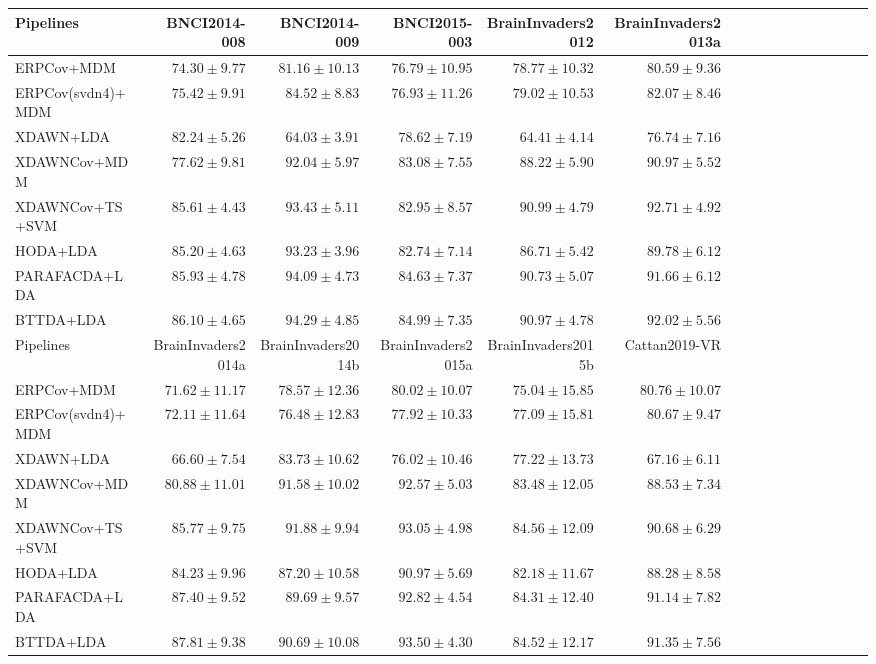 \begin{tabular}{@{}lrrrrrrrrrrrrrrr@{}}
\toprule
Pipelines & BNCI2014-008 & BNCI2014-009 & BNCI2015-003 & BrainInvaders2012 & BrainInvaders2013a \\
\midrule
ERPCov+MDM & $74.30\pm9.77$ & $81.16\pm10.13$ & $76.79\pm10.95$ & $78.77\pm10.32$ & $80.59\pm9.36$ \\
ERPCov(svdn4)+MDM & $75.42\pm9.91$ & $84.52\pm8.83$ & $76.93\pm11.26$ & $79.02\pm10.53$ & $82.07\pm8.46$ \\
XDAWN+LDA & $82.24\pm5.26$ & $64.03\pm3.91$ & $78.62\pm7.19$ & $64.41\pm4.14$ & $76.74\pm7.16$ \\
XDAWNCov+MDM & $77.62\pm9.81$ & $92.04\pm5.97$ & $83.08\pm7.55$ & $88.22\pm5.90$ & $90.97\pm5.52$ \\
XDAWNCov+TS+SVM & $85.61\pm4.43$ & $93.43\pm5.11$ & $82.95\pm8.57$ & \boldmath$90.99\pm4.79$ & \boldmath$92.71\pm4.92$ \\HODA+LDA & $85.20\pm4.63$ & $93.23\pm3.96$ & $82.74\pm7.14$ & $86.71\pm5.42$ & $89.78\pm6.12$ \\
PARAFACDA+LDA & $85.93\pm4.78$ & $94.09\pm4.73$ & $84.63\pm7.37$ & $90.73\pm5.07$ & $91.66\pm6.12$ \\
BTTDA+LDA & \boldmath$86.10\pm4.65$ & \boldmath$94.29\pm4.85$ & \boldmath$84.99\pm7.35$ & $90.97\pm4.78$ & $92.02\pm5.56$ \\
\midrule 
Pipelines & BrainInvaders2014a & BrainInvaders2014b & BrainInvaders2015a & BrainInvaders2015b & Cattan2019-VR \\
\midrule
ERPCov+MDM & $71.62\pm11.17$ & $78.57\pm12.36$ & $80.02\pm10.07$ & $75.04\pm15.85$ & $80.76\pm10.07$ \\
ERPCov(svdn4)+MDM & $72.11\pm11.64$ & $76.48\pm12.83$ & $77.92\pm10.33$ & $77.09\pm15.81$ & $80.67\pm9.47$ \\
XDAWN+LDA & $66.60\pm7.54$ & $83.73\pm10.62$ & $76.02\pm10.46$ & $77.22\pm13.73$ & $67.16\pm6.11$ \\
XDAWNCov+MDM & $80.88\pm11.01$ & $91.58\pm10.02$ & $92.57\pm5.03$ & $83.48\pm12.05$ & $88.53\pm7.34$ \\
XDAWNCov+TS+SVM & $85.77\pm9.75$ & \boldmath$91.88\pm9.94$ & $93.05\pm4.98$ & \boldmath$84.56\pm12.09$ & $90.68\pm6.29$ \\HODA+LDA & $84.23\pm9.96$ & $87.20\pm10.58$ & $90.97\pm5.69$ & $82.18\pm11.67$ & $88.28\pm8.58$ \\
PARAFACDA+LDA & $87.40\pm9.52$ & $89.69\pm9.57$ & $92.82\pm4.54$ & $84.31\pm12.40$ & $91.14\pm7.82$ \\
BTTDA+LDA & \boldmath$87.81\pm9.38$ & $90.69\pm10.08$ & \boldmath$93.50\pm4.30$ & $84.52\pm12.17$ & \boldmath$91.35\pm7.56$ \\


\end{tabular}
